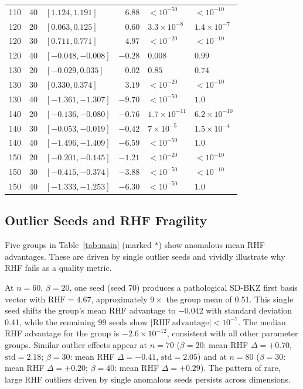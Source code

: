 \documentclass[journal=cic,version=preprint]{iacrj}
\begin{document}
\begin{table}[tbp]
\begin{tabular}{rrlrll}
110 & 40 & $[1.124, 1.191]$ & $6.88$  & $<10^{-50}$ & $<10^{-10}$ \\
120 & 20 & $[0.063, 0.125]$ & $0.60$  & $3.3\times 10^{-8}$ & $1.4\times 10^{-7}$ \\
120 & 30 & $[0.711, 0.771]$ & $4.97$  & $<10^{-20}$ & $<10^{-10}$ \\
120 & 40 & $[-0.048, -0.008]$ & $-0.28$ & $0.008$ & $0.99$ \\
130 & 20 & $[-0.029, 0.035]$ & $0.02$  & $0.85$ & $0.74$ \\
130 & 30 & $[0.330, 0.374]$ & $3.19$  & $<10^{-20}$ & $<10^{-10}$ \\
130 & 40 & $[-1.361, -1.307]$ & $-9.70$ & $<10^{-50}$ & $1.0$ \\
140 & 20 & $[-0.136, -0.080]$ & $-0.76$ & $1.7\times 10^{-11}$ & $6.2\times 10^{-10}$ \\
140 & 30 & $[-0.053, -0.019]$ & $-0.42$ & $7\times 10^{-5}$ & $1.5\times 10^{-4}$ \\
140 & 40 & $[-1.496, -1.409]$ & $-6.59$ & $<10^{-50}$ & $1.0$ \\
150 & 20 & $[-0.201, -0.145]$ & $-1.21$ & $<10^{-20}$ & $<10^{-10}$ \\
150 & 30 & $[-0.415, -0.374]$ & $-3.88$ & $<10^{-50}$ & $<10^{-10}$ \\
150 & 40 & $[-1.333, -1.253]$ & $-6.30$ & $<10^{-50}$ & $1.0$ \\
\hline
\end{tabular}
\end{table}

\subsection{Outlier Seeds and RHF Fragility}
\label{sec:outliers}

Five groups in Table~\ref{tab:main} (marked $\ast$) show anomalous mean RHF advantages. These are driven by single outlier seeds and vividly illustrate why RHF fails as a quality metric.

At $n=60$, $\beta=20$, one seed (seed 70) produces a pathological SD-BKZ first basis vector with $\mathrm{RHF}=4.67$, approximately $9\times$ the group mean of 0.51. This single seed shifts the group's mean RHF advantage to $-0.042$ with standard deviation 0.41, while the remaining 99 seeds show $|\mathrm{RHF\ advantage}|<10^{-7}$. The median RHF advantage for the group is $-2.6\times 10^{-12}$, consistent with all other parameter groups. Similar outlier effects appear at $n=70$ ($\beta=20$: mean RHF $\Delta=+0.70$, $\mathrm{std}=2.18$; $\beta=30$: mean RHF $\Delta=-0.41$, $\mathrm{std}=2.05$) and at $n=80$ ($\beta=30$: mean RHF $\Delta=+0.20$; $\beta=40$: mean RHF $\Delta=+0.29$). The pattern of rare, large RHF outliers driven by single anomalous seeds persists across dimensions.
\end{document}
